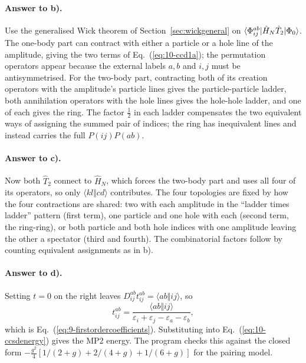 \paragraph{Answer to b).}
Use the generalised Wick theorem of Section~\ref{sec:wickgeneral} on
$\langle \Phi_{ij}^{ab} | \hat{H}_N\hat{T}_2 | \Phi_0 \rangle$.  The one-body part
can contract with either a particle or a hole line of the amplitude, giving
the two terms of Eq.~(\ref{eq:10-ccd1a}); the permutation operators appear
because the external labels $a,b$ and $i,j$ must be antisymmetrised.  For the
two-body part, contracting both of its creation operators with the amplitude's
particle lines gives the particle-particle ladder, both annihilation
operators with the hole lines gives the hole-hole ladder, and one of each
gives the ring.  The factor $\tfrac12$ in each ladder compensates the two
equivalent ways of assigning the summed pair of indices; the ring has
inequivalent lines and instead carries the full $P(ij)P(ab)$.

\paragraph{Answer to c).}
Now both $\hat{T}_2$ connect to $\hat{H}_N$, which forces the two-body part
and uses all four of its operators, so only
$\langle kl\Vert cd\rangle$ contributes.  The four topologies are fixed by
how the four contractions are shared: two with each amplitude in the ``ladder
times ladder'' pattern (first term), one particle and one hole with each
(second term, the ring-ring), or both particle and both hole indices with one
amplitude leaving the other a spectator (third and fourth).  The combinatorial
factors follow by counting equivalent assignments as in b).

\paragraph{Answer to d).}
Setting $t=0$ on the right leaves
$D_{ij}^{ab}t_{ij}^{ab}=\langle ab\Vert ij\rangle$, so
\begin{equation}
  t_{ij}^{ab} = \frac{\langle ab\Vert ij\rangle}
    {\varepsilon_i+\varepsilon_j-\varepsilon_a-\varepsilon_b},
  \label{eq:10-exd3}
\end{equation}
which is Eq.~(\ref{eq:9-firstordercoefficients}).  Substituting into
Eq.~(\ref{eq:10-ccsdenergy}) gives the MP2 energy.  The program checks this
against the closed form
$-\tfrac{g^2}{4}[1/(2+g)+2/(4+g)+1/(6+g)]$ for the pairing model.

